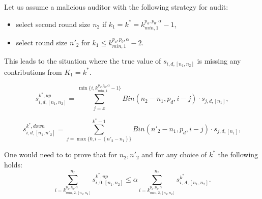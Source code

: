 \begin{example} 
Let us assume a malicious auditor with the following strategy for \Minerva audit:
\begin{itemize}
 \item select second round size $n_2$ if $k_{1} = k^* = k^{p_a, p_0, \alpha}_{min, 1} - 1$,
 \item select round size $n'_2$ for $k_1 \leq k^{p_a, p_0, \alpha}_{min, 1} - 2$.
\end{itemize}
This leads to the situation where the true value of $s_{i, d, [n_1, n_2]}$ is missing any contributions from $K_1=k^*$.

\[
 s^{k^*, up}_{i, d, [n_1, n_{2}]} = \sum_{j = x}^{\min\{i, k^{p_a, p_0, \alpha}_{min, 1}-1\}} Bin(n_{2} - n_1, p_d, i - j) \cdot s_{j, d, [n_1]},
\]

\[
 s^{k^*, down}_{i, d, [n_1, n'_{2}]} = \sum_{j = \max\{0, i - (n'_2 - n_1)\}}^{k^*-1} Bin(n'_{2} - n_1, p_d, i - j) \cdot s_{j, d, [n_1]},
\]

One would need to to prove that for $n_2, n'_2$ and for any choice of $k^*$ the following holds:
\[
\sum_{i = k^{p_a, p_0, \alpha}_{min, 2, [n_1, n_2]}}^{n_r} s^{k^*, up}_{i, 0, [n_1, n_2]} \le \alpha \sum_{i = k^{p_a, p_0, \alpha}_{min, 2, [n_1, n_2]}}^{n_r} s^{k^*}_{i, A, [n_1, n_2]}.
\]
\end{example}


